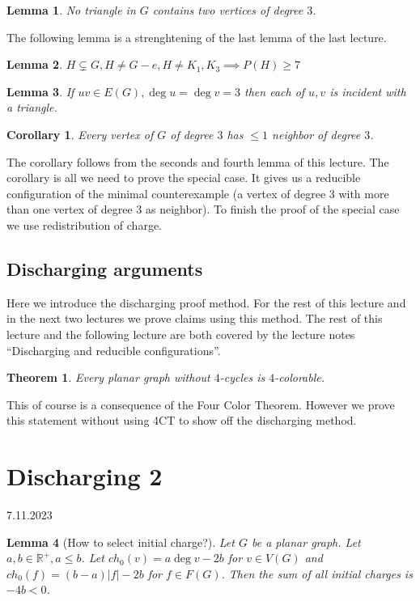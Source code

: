 \documentclass{article}
\newtheorem*{theorem}{Theorem}
\newtheorem*{lemma}{Lemma}
\newtheorem*{corollary}{Corollary}
\begin{document}
\begin{lemma}
	No triangle in $G$ contains two vertices of degree $3$.
\end{lemma}

\noindent
The following lemma is a strenghtening of the last lemma of the last lecture.

\begin{lemma}
	$H \subsetneq G, H \neq G - e, H \neq K_1, K_3 \implies P(H) \ge 7$
\end{lemma}

\begin{lemma}
	If $uv \in E(G), \deg u = \deg v = 3$ then each of $u,v$ is incident
	with a triangle.
\end{lemma}

\begin{corollary}
	Every vertex of $G$ of degree $3$ has $\le 1$ neighbor of degree $3$.
\end{corollary}

\noindent
The corollary follows from the seconds and fourth lemma of this lecture. The
corollary is all we need to prove the special case. It gives us a reducible
configuration of the minimal counterexample (a vertex of degree 3 with more
than one vertex of degree 3 as neighbor). To finish the proof of the special
case we use redistribution of charge.

\subsection*{Discharging arguments}
Here we introduce the discharging proof method. For the rest of this lecture
and in the next two lectures we prove claims using this method. The rest of
this lecture and the following lecture are both covered by the lecture notes
\enquote{Discharging and reducible configurations}.

\begin{theorem}
	Every planar graph without $4$-cycles is $4$-colorable.
\end{theorem}

\noindent
This of course is a consequence of the Four Color Theorem. However we prove
this statement without using 4CT to show off the discharging method.


\newpage
\section{Discharging 2} %
7.11.2023

\begin{lemma}[How to select initial charge?]
	Let $G$ be a planar graph. Let $a, b \in \mathbb{R}^+, a \le b$. Let
	$ch_0(v) = a \deg v  - 2b$ for $v \in V(G)$ and $ch_0(f) = (b - a)|f| -
	2b$ for $f \in F(G)$. Then the sum of all initial charges is $-4b < 0$.
\end{lemma}
\end{document}
